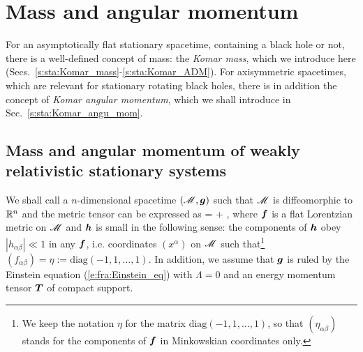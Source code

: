 

\section{Mass and angular momentum} \label{s:sta:mass_angul_mom}

For an asymptotically flat stationary spacetime, containing a
black hole or not, there is a well-defined concept of mass: the \emph{Komar mass},
which we introduce here (Secs.~\ref{s:sta:Komar_mass}-\ref{s:sta:Komar_ADM}).
For axisymmetric spacetimes, which are relevant
for stationary rotating black holes, there is in addition the concept
of \emph{Komar angular momentum}, which we shall introduce in Sec.~\ref{s:sta:Komar_angu_mom}.

\subsection{Mass and angular momentum of weakly relativistic stationary systems}
\label{s:sta:weakly_relativistic}

We shall call 
a $n$-dimensional spacetime $(\mathscr{M},\bm{g})$
such that $\mathscr{M}$ is diffeomorphic to $\mathbb{R}^n$ and the metric tensor can be expressed as
\be \label{e:sta:weak_g_f_h}
     =  +  ,
\ee
where $\bm{f}$ is a flat Lorentzian metric on $\mathscr{M}$ and $\bm{h}$ is small in the following
sense: the components of $\bm{h}$ obey $|h_{\alpha\beta}| \ll 1$
in any  $\bm{f}$, i.e. coordinates
$(x^\alpha)$ on $\mathscr{M}$ such that\footnote{We keep the notation $\eta$ for the matrix $\mathrm{diag}(-1,1,\ldots,1)$, so that
$(\eta_{\alpha\beta})$ stands for the components of $\bm{f}$ in Minkowskian coordinates only.}
$(f_{\alpha\beta}) = \eta := \mathrm{diag}(-1,1,\ldots,1)$.
In addition, we assume that $\bm{g}$
is ruled by the Einstein equation (\ref{e:fra:Einstein_eq}) with $\Lambda=0$
and an energy momentum tensor $\bm{T}$ of compact support.

